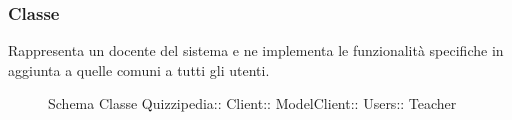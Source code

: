 \subsubsection{Classe }
Rappresenta un docente del sistema e ne implementa le funzionalità specifiche in aggiunta a quelle comuni a tutti gli utenti.
\begin{figure}[H]
\centering
\noindent{}
\caption[Schema Classe Teacher]{Schema Classe Quizzipedia:: Client:: ModelClient:: Users:: Teacher}
\end{figure}
